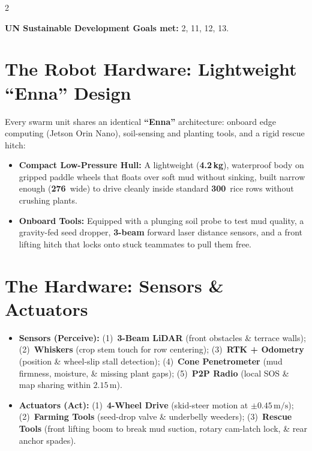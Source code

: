 \documentclass[9pt,a4paper]{article}
\begin{document}
\begin{multicols}{2}
\begin{table}[H]
\parbox{\linewidth}{
\centering
\textbf{UN Sustainable Development Goals met:} 2, 11, 12, 13.
}
\end{table}

\section{\textbf{The Robot Hardware: Lightweight ``Enna'' Design}}
Every swarm unit shares an identical \textbf{``Enna''} architecture: onboard edge computing (Jetson Orin Nano), soil-sensing and planting tools, and a rigid rescue hitch:
\begin{itemize}
    \item \textbf{Compact Low-Pressure Hull:} A lightweight (\textbf{4.2\,kg}), waterproof body on gripped paddle wheels that floats over soft mud without sinking, built narrow enough (\textbf{276\,} wide) to drive cleanly inside standard \textbf{300\,} rice rows without crushing plants.
    \item \textbf{Onboard Tools:} Equipped with a plunging soil probe to test mud quality, a gravity-fed seed dropper, \textbf{3-beam} forward laser distance sensors, and a front lifting hitch that locks onto stuck teammates to pull them free.
\end{itemize}

\section{\textbf{The Hardware: Sensors \& Actuators}}
\begin{itemize}
    \item \textbf{Sensors (Perceive):} (1)~\textbf{3-Beam LiDAR} (front obstacles \& terrace walls); (2)~\textbf{Whiskers} (crop stem touch for row centering); (3)~\textbf{RTK + Odometry} (position \& wheel-slip stall detection); (4)~\textbf{Cone Penetrometer} (mud firmness, moisture, \& missing plant gaps); (5)~\textbf{P2P Radio} (local SOS \& map sharing within $2.15\,\text{m}$).
    \item \textbf{Actuators (Act):} (1)~\textbf{4-Wheel Drive} (skid-steer motion at $\pm 0.45\,\text{m/s}$); (2)~\textbf{Farming Tools} (seed-drop valve \& underbelly weeders); (3)~\textbf{Rescue Tools} (front lifting boom to break mud suction, rotary cam-latch lock, \& rear anchor spades).
\end{itemize}


\end{multicols}
\end{document}
